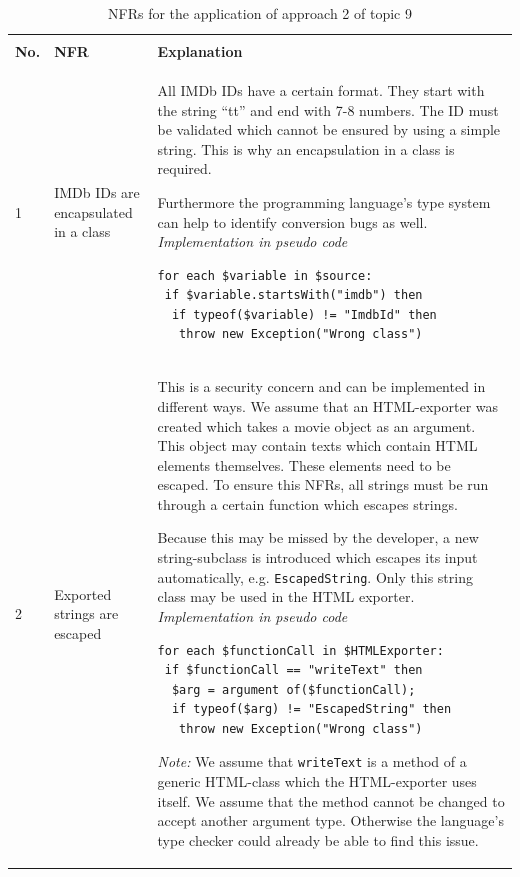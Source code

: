 \begin{longtable}[th]{p{}|p{}|p{}}
	\caption{\glspl{NFR} for the application of approach 2 of topic 9}
	\label{tbl:topic_9_approach_2_nfr}
	\setlength{\tabcolsep}{1em} \\    %
	\textbf{No.} & \textbf{NFR} & \textbf{Explanation} \\
	\toprule
	1 & IMDb IDs are encapsulated in a class &
	All IMDb IDs have a certain format. They start with the string \enquote{tt} and end with 7-8 numbers. The ID must be validated which cannot be ensured by using a simple string. This is why an encapsulation in a class is required.
	
	Furthermore the programming language's type system can help to identify conversion bugs as well.
	\newline \newline \textit{Implementation in pseudo code}
	\begin{lstlisting}
for each $variable in $source:
 if $variable.startsWith("imdb") then
  if typeof($variable) != "ImdbId" then
   throw new Exception("Wrong class")
	\end{lstlisting}\\
	\midrule
	
	2 & Exported strings are escaped &
	This is a security concern and can be implemented in different ways. We assume that an HTML-exporter was created which takes a movie object as an argument.
	This object may contain texts which contain HTML elements themselves.
	These elements need to be escaped. To ensure this \glspl{NFR}, all strings must be run through a certain function which escapes strings.
	
	Because this may be missed by the developer, a new string-subclass is introduced which escapes its input automatically, e.g. \texttt{EscapedString}.
	Only this string class may be used in the HTML exporter.
	\newline \newline \textit{Implementation in pseudo code}
	
	\begin{lstlisting}
for each $functionCall in $HTMLExporter:
 if $functionCall == "writeText" then
  $arg = argument of($functionCall);
  if typeof($arg) != "EscapedString" then
   throw new Exception("Wrong class")
	\end{lstlisting}

\textit{Note:} We assume that \texttt{writeText} is a method of a generic HTML-class which the HTML-exporter uses itself. We assume that the method cannot be changed to accept another argument type. Otherwise the language's type checker could already be able to find this issue.\\

\bottomrule
\end{longtable}


